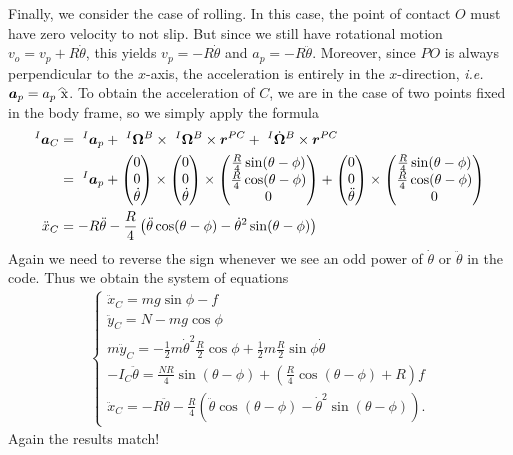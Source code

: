 \documentclass[12pt]{article}
\begin{document}
Finally, we consider the case of rolling. In this case, the point of contact $ O$ must have zero velocity to not slip. But since we still have rotational motion $ v_o = v_p + R \dot{\theta}$, this yields $ v_p = - R \dot{\theta}$ and $ a_p = -R \ddot{\theta}$. Moreover, since $ PO$ is always perpendicular to the  $ x$-axis, the acceleration is entirely in the  $ x$-direction, \emph{i.e.} $ \ve{ a}_p = a_p \wh{ x} $. To obtain the acceleration of $ C$, we are in the case of two points fixed in the body frame, so we simply apply the formula
 \begin{align*}
	 ^I\ve{ a}_C &= \ ^I \ve{ a}_p + \ ^I\ve{ \Omega }^B \times \ ^I\ve{\Omega}^B \times \ve{ r}^{PC} +\ ^I\dot{\ve{ \Omega}}^B \times \ve{ r}^{PC}  \\
		       &=\ ^I \ve{ a}_p + \begin{pmatrix} 0\\0\\ \dot{\theta} \end{pmatrix}  \times \begin{pmatrix} 0\\0\\ \dot{\theta} \end{pmatrix} \times \begin{pmatrix} \frac{R}{4} \sin(\theta - \phi) \\ \frac{R}{4} \cos(\theta-\phi)\\0 \end{pmatrix} + \begin{pmatrix} 0\\0\\ \ddot{\theta} \end{pmatrix} \times \begin{pmatrix} \frac{R}{4} \sin(\theta - \phi) \\ \frac{R}{4} \cos(\theta-\phi)\\0 \end{pmatrix}  \\
		      \ddot{x}_C &= -R \ddot{\theta} - \frac{R}{4} \left( \ddot{\theta} \cos(\theta - \phi) - \dot{\theta}^2 \sin(\theta - \phi) \right)  
\end{align*}
Again we need to reverse the sign whenever we see an odd power of $ \dot{\theta}$ or $ \ddot{\theta}$ in the code. Thus we obtain the system of equations
\begin{align*}
\begin{cases}
	\ddot{x}_C = mg \sin\phi-f\\
	\ddot{y}_C = N - mg \cos \phi \\
	m \ddot{y}_C = - \frac{1}{2}m \dot{\theta}^2 \frac{R}{2} \cos \phi + \frac{1}{2}m \frac{R}{2} \sin \phi \dot{\theta} \\
	-I_C \ddot{\theta} = \frac{NR}{4} \sin(\theta - \phi) + \left( \frac{R}{4} \cos(\theta - \phi) +R \right) f \\
	\ddot{x}_C = -R \ddot{\theta} - \frac{R}{4} \left( \ddot{\theta} \cos(\theta - \phi) - \dot{\theta}^2 \sin(\theta - \phi) \right).
\end{cases}
\end{align*}
Again the results match!
\end{document}
